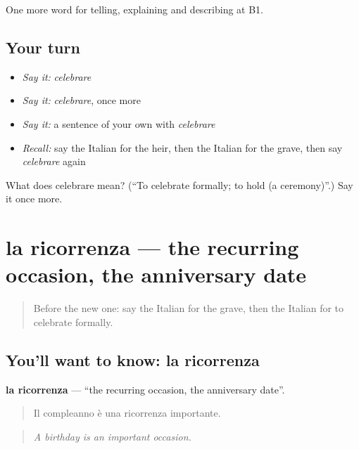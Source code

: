 \begin{grammarlens}[title={What you've built}]
One more word for telling, explaining and describing at B1.
\end{grammarlens}

\subsection*{Your turn}
\begin{itemize}
\raggedright
  \item \emph{Say it:} \emph{celebrare}
  \item \emph{Say it:} \emph{celebrare}, once more
  \item \emph{Say it:} a sentence of your own with \emph{celebrare}
  \item \emph{Recall:} say the Italian for the heir, then the Italian for the grave, then say \emph{celebrare} again
\end{itemize}

\begin{tcolorbox}[breakable,colback=teal!4,colframe=teal!35!black,title={Before you move on}]
What does celebrare mean? (\textquotedblleft{}To celebrate formally; to hold (a ceremony)\textquotedblright{}.) Say it once more.
\end{tcolorbox}
\section[la ricorrenza]{la ricorrenza — the recurring occasion, the anniversary date}

\label{lesson:IT-C315-ricorrenza}



\begin{quote}
Before the new one: say the Italian for the grave, then the Italian for to celebrate formally.
\end{quote}

\subsection*{You'll want to know: la ricorrenza}
\textbf{la ricorrenza} — \textquotedblleft{}the recurring occasion, the anniversary date\textquotedblright{}.

\begin{quote}
Il compleanno è una ricorrenza importante.
\end{quote}

\begin{quote}
\emph{A birthday is an important occasion.}
\end{quote}

